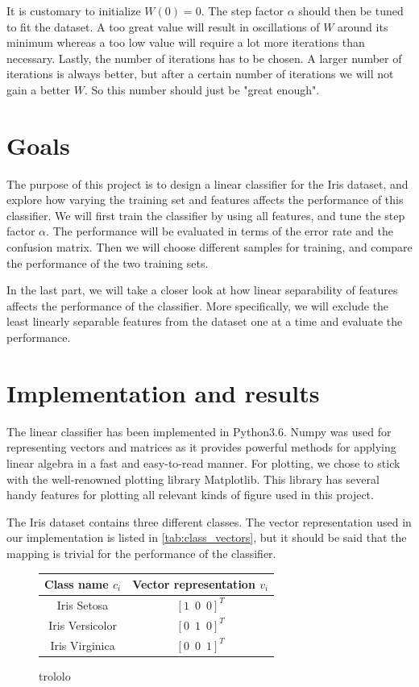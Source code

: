 \documentclass{article}
\begin{document}
It is customary to initialize $W(0) = 0$. The step factor $\alpha$ should then be tuned to fit the dataset.
A too great value will result in oscillations of $W$ around its minimum whereas a too low value will
require a lot more iterations than necessary. Lastly, the number of iterations has to be chosen.
A larger number of iterations is always better, but after a certain number of iterations we will
not gain a better $W$. So this number should just be "great enough".

\section{Goals}\label{sec:purpose}

The purpose of this project is to design a linear classifier for the Iris dataset,
and explore how varying the training set and features affects the performance of
this classifier. We will first train the classifier by using all features, and tune
the step factor $\alpha$. The performance will be evaluated in terms of the error
rate and the confusion matrix. Then we will choose different samples for training,
and compare the performance of the two training sets.

In the last part, we will take a closer look at how linear separability of features
affects the performance of the classifier. More specifically, we will exclude the
least linearly separable features from the dataset one at a time and evaluate the
performance.

\section{Implementation and results}\label{sec:implementation_and_results}

The linear classifier has been implemented in Python3.6. Numpy was used for
representing vectors and matrices as it provides powerful methods for applying
linear algebra in a fast and easy-to-read manner. For plotting, we chose to stick
with the well-renowned plotting library Matplotlib. This library has several
handy features for plotting all relevant kinds of figure used in this project.

The Iris dataset contains three different classes. The vector representation used
in our implementation is listed in \autoref{tab:class_vectors}, but it should be
said that the mapping is trivial for the performance of the classifier.

\begin{figure}
    \centering
    \begin{tabular}{ | c | c | }
        \hline
        Class name $c_i$ & Vector representation $v_i$ \\
        \hline
        Iris Setosa & $[1 \enspace 0 \enspace 0]^T$ \\
        Iris Versicolor & $[0 \enspace 1 \enspace 0]^T$ \\
        Iris Virginica & $[0 \enspace 0 \enspace 1]^T$ \\
        \hline
    \end{tabular}
    \caption{trololo}
    \label{tab:class_vectors}
\end{figure}
\end{document}
